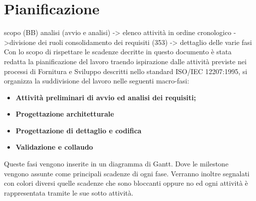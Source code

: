 \section{Pianificazione}
	scopo (BB)
	analisi (avvio e analisi)
	-> elenco attività in ordine cronologico
	->divisione dei ruoli
	consolidamento dei requisiti (353)
	-> dettaglio delle varie fasi
	\newline
	\newline
	Con lo scopo di rispettare le scadenze decritte in questo documento è stata redatta la pianificazione del lavoro traendo ispirazione dalle attività previste nei processi di Fornitura e Sviluppo descritti nello standard ISO/IEC 12207:1995, si organizza la suddivisione del lavoro nelle seguenti macro-fasi:
	\begin{itemize}
		\item{\textbf{Attività preliminari di avvio ed analisi dei requisiti;}}
		\item{\textbf{Progettazione architetturale}}
		\item{\textbf{Progettazione di dettaglio e codifica}}
		\item{\textbf{Validazione e collaudo}}
	\end{itemize}

	Queste fasi vengono inserite in un diagramma di Gantt. Dove le milestone vengono assunte come principali scadenze di ogni fase. Verranno inoltre segnalati con colori diversi quelle scadenze che sono bloccanti oppure no ed  ogni attività è rappresentata tramite le sue sotto attività.
	
